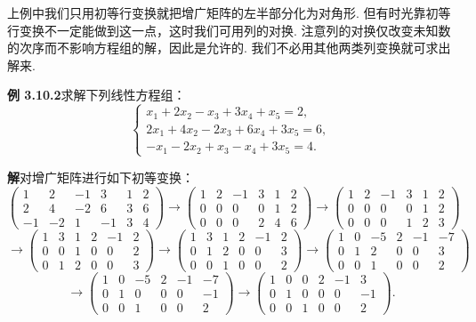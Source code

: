 \documentclass[UTF8,12pt,a4paper,fontset=fandol]{ctexart}
\begin{document}
上例中我们只用初等行变换就把增广矩阵的左半部分化为对角形. 但有时光靠初等行变换不一定能做到这一点，这时我们可用列的对换. 注意列的对换仅改变未知数的次序而不影响方程组的解，因此是允许的. 我们不必用其他两类列变换就可求出解来.

\noindent\textbf{例 3.10.2}\quad 求解下列线性方程组：
\[
\left\{\begin{array}{r}
x_1+2x_2-x_3+3x_4+x_5=2,\\
2x_1+4x_2-2x_3+6x_4+3x_5=6,\\
-x_1-2x_2+x_3-x_4+3x_5=4.
\end{array}\right.
\]

\noindent\textbf{解}\quad 对增广矩阵进行如下初等变换：
\[
\left(\begin{array}{rrrrr|r}
1&2&-1&3&1&2\\
2&4&-2&6&3&6\\
-1&-2&1&-1&3&4
\end{array}\right)
\to
\left(\begin{array}{rrrrr|r}
1&2&-1&3&1&2\\
0&0&0&0&1&2\\
0&0&0&2&4&6
\end{array}\right)
\to
\left(\begin{array}{rrrrr|r}
1&2&-1&3&1&2\\
0&0&0&0&1&2\\
0&0&0&1&2&3
\end{array}\right)
\]
\[
\to
\left(\begin{array}{rrrrr|r}
1&3&1&2&-1&2\\
0&0&1&0&0&2\\
0&1&2&0&0&3
\end{array}\right)
\to
\left(\begin{array}{rrrrr|r}
1&3&1&2&-1&2\\
0&1&2&0&0&3\\
0&0&1&0&0&2
\end{array}\right)
\to
\left(\begin{array}{rrrrr|r}
1&0&-5&2&-1&-7\\
0&1&2&0&0&3\\
0&0&1&0&0&2
\end{array}\right)
\]
\[
\to
\left(\begin{array}{rrrrr|r}
1&0&-5&2&-1&-7\\
0&1&0&0&0&-1\\
0&0&1&0&0&2
\end{array}\right)
\to
\left(\begin{array}{rrrrr|r}
1&0&0&2&-1&3\\
0&1&0&0&0&-1\\
0&0&1&0&0&2
\end{array}\right).
\]
\end{document}
